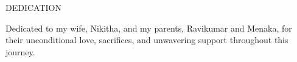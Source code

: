 \begin{center}
DEDICATION
\end{center}

Dedicated to my wife, Nikitha, and my parents, Ravikumar and Menaka, for their unconditional love, sacrifices, and unwavering support throughout this journey.

